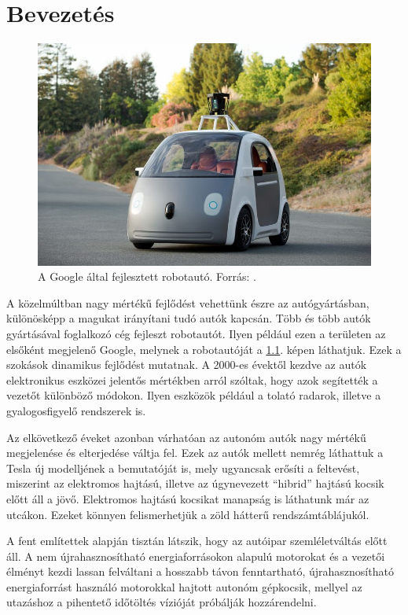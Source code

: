 \documentclass[a4paper,12pt]{report}
\begin{document}
\chapter{Bevezetés}

\begin{figure}[h]
\centerline{
\includegraphics[width=6in]{img/googleauto}}
\caption{A Google által fejlesztett robotautó. Forrás: \cite{googlecarimage}.}
\label{googleauto}
\end{figure}

A közelmúltban nagy mértékű fejlődést vehettünk észre az autógyártásban, különösképp a magukat irányítani tudó autók kapcsán. Több és több autók gyártásával foglalkozó cég fejleszt robotautót. Ilyen például ezen a területen az elsőként megjelenő Google, melynek a robotautóját a \ref{googleauto}. képen láthatjuk. Ezek a szokások dinamikus fejlődést mutatnak. A 2000-es évektől kezdve az autók elektronikus eszközei jelentős mértékben arról szóltak, hogy azok segítették a vezetőt különböző módokon. Ilyen eszközök például a tolató radarok, illetve a gyalogosfigyelő rendszerek is. 

\vspace{2mm}
Az elkövetkező éveket azonban várhatóan az autonóm autók nagy mértékű megjelenése és elterjedése váltja fel. Ezek az autók mellett nemrég láthattuk a Tesla új modelljének a bemutatóját is, mely ugyancsak erősíti a feltevést, miszerint az elektromos hajtású, illetve az úgynevezett ``hibrid'' hajtású kocsik előtt áll a jövő. Elektromos hajtású kocsikat manapság is láthatunk már az utcákon. Ezeket könnyen felismerhetjük a zöld hátterű rendszámtáblájukól.

\vspace{2mm}
A fent említettek alapján tisztán látszik, hogy az autóipar szemléletváltás előtt áll. A nem újrahasznosítható energiaforrásokon alapulú motorokat és a vezetői élményt kezdi lassan felváltani a hosszabb távon fenntartható, újrahasznosítható energiaforrást használó motorokkal hajtott autonóm gépkocsik, mellyel az utazáshoz a pihentető időtöltés vízióját próbálják hozzárendelni.
\end{document}
